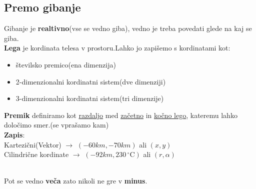 {\color{indiagreen}\subsection{Premo gibanje}}
Gibanje je \textbf{realtivno}(vse se vedno giba), vedno je treba povedati glede na kaj se giba.\\
\textbf{Lega} je kordinata telesa v prostoru.Lahko jo zapišemo s kordinatami kot:
\begin{itemize}
    \item številsko premico(ena dimenzija)
    \item 2-dimenzionalni kordinatni sistem(dve dimenziji)
    \item 3-dimenzionalni kordinatni sistem(tri dimenzije)
\end{itemize}
\textbf{Premik} definiramo kot \underline{razdaljo} med \underline{začetno} in \underline{kočno lego}, kateremu lahko določimo smer.(se vprašamo kam)\\
\textbf{Zapis}:
\\
Kartezični(Vektor) $\rightarrow$ \quad $(-60 km, -70 km)$ ali $(x, y)$\\
Cilindrične kordinate $\rightarrow$ \quad $(-92 km, 230 \,^{\circ}\mathrm{C})$ ali $(r, \alpha)$\\
\\

Pot se vedno \textbf{veča} zato nikoli ne gre v \textbf{minus}.